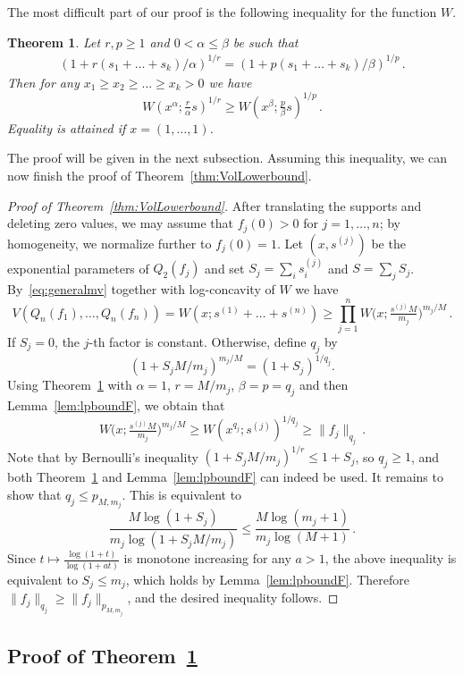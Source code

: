 \documentclass[a4paper,reqno,12pt]{amsart}
\newtheorem{theorem}{Theorem}
\newcommand{\al}{\alpha}
\newcommand{\be}{\beta}
\newcommand{\1}{\bo{1}}
\begin{document}
The most difficult part of our proof is the following inequality for the function $W$.
\begin{theorem}\label{thm:1Dineq}
	Let $r,p \geq 1$ and $0<\al \leq \be$ be such that
	\begin{align}\label{id:condat1}
		(1+r(s_1+\dots+s_k)/\al)^{1/r} =(1+p(s_1+\dots+s_k)/\be)^{1/p}\,.
	\end{align}
	Then for any $x_1\ge x_2\ge\dots \ge x_k> 0$
	we have
	\begin{equation}\label{eq:ineqBsymmetric}
		W(x^{\alpha};\tfrac{r}{\alpha}s)^{1/r} \ge 
		W(x^{\beta};\tfrac{p}{\beta}s)^{1/p}\,.
	\end{equation}
	Equality is attained if $x=(1,\dots,1)$.
\end{theorem}
The proof will be given in the next subsection. Assuming this inequality, we can now finish the proof of Theorem~\ref{thm:VolLowerbound}.
\begin{proof}[Proof of Theorem~\ref{thm:VolLowerbound}]
	After translating the supports and deleting zero values, we may assume that $f_j(0)>0$ for $j=1,\dots,n$; by homogeneity, we normalize further to $f_j(0)=1$.
	Let $(x,s^{(j)})$ be the exponential parameters of $Q_2(f_j)$ and set $S_j=\sum_{i}s_i^{(j)}$ and $S=\sum_j S_j$. By~\eqref{eq:generalmv} together with log-concavity of $W$ we have
	\[V(Q_n(f_1),\dots,Q_n(f_n)) = W(x;s^{(1)}+\dots+s^{(n)}) \ge \prod_{j=1}^{n}W\Big(x;\tfrac{s^{(j)}M}{m_j}\Big)^{m_j/M}\,.\]
	If $S_j=0$, the $j$-th factor is constant. Otherwise, define $q_j$ by
	\[(1+S_jM/m_j)^{m_j/M}=(1+S_j)^{1/q_j}.\]
	Using Theorem~\ref{thm:1Dineq} with $\alpha=1$, $r=M/m_j$, $\beta=p=q_j$ and then Lemma~\ref{lem:lpboundF}, we obtain that
	\[W\Big(x;\tfrac{s^{(j)}M}{m_j}\Big)^{m_j/M} \ge W(x^{q_{j}};s^{(j)})^{1/q_{j}} \ge \|f_j\|_{q_{j}}\,.\]
	Note that by Bernoulli's inequality $(1+S_jM/m_j)^{1/r} \le 1+S_j$, so $q_j\ge1$, and both Theorem~\ref{thm:1Dineq} and Lemma~\ref{lem:lpboundF} can indeed be used. It remains to show that $q_j\le p_{M,m_j}$. This is equivalent to
		\[\frac{M\log(1+S_j)}{m_j\log(1+S_jM/m_j)} \le \frac{M\log(m_j+1)}{m_j\log(M+1)}\,.\]
	Since $t\mapsto \frac{\log(1+t)}{\log(1+at)}$ is monotone increasing for any $a>1$, the above inequality is equivalent to $S_j\le m_j$, which holds by Lemma~\ref{lem:lpboundF}. Therefore $\|f_j\|_{q_j}\ge \|f_j\|_{p_{M,m_j}}$, and the desired inequality follows.
\end{proof}

\subsection{Proof of Theorem~\ref{thm:1Dineq}}
\end{document}
